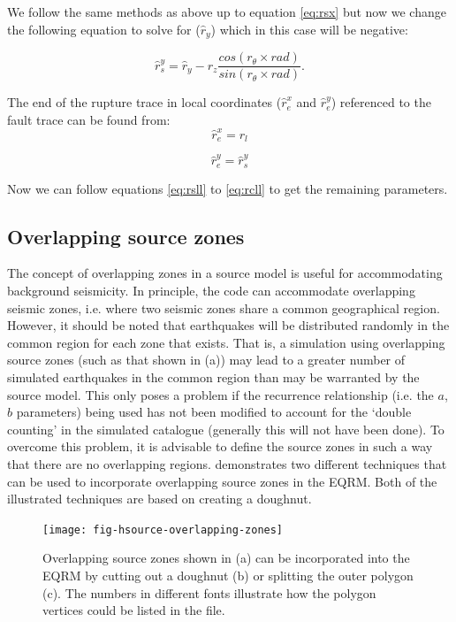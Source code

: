 We follow the same methods as above up to equation \ref{eq:rsx} but now we change the following equation 
to solve for ($\hat{r}_y$) which in this case will be negative:

\begin{equation}\label{eq:ry4}
\hat{r}_s^y = \hat{r}_y -  r_z  \frac{cos(r_\theta  \times rad)}{sin(r_\theta \times rad)}.
\end{equation}

The end of the rupture trace in local coordinates ($\hat{r}_e^x$ and $\hat{r}_e^y$) referenced to the fault 
trace can be found from:
\begin{equation}
\hat{r}_e^x = r_l
\end{equation}

\begin{equation}
\hat{r}_e^y = \hat{r}_s^y
\end{equation}

Now we can follow equations \ref{eq:rsll} to \ref{eq:rcll} to get the remaining parameters.


\subsection{Overlapping source zones}

The concept of overlapping zones in a source model is useful for
accommodating background seismicity. In principle, the code can
accommodate overlapping seismic zones, i.e. where two seismic
zones share a common geographical region. However, it should be
noted that earthquakes will be distributed randomly in the common
region for each zone that exists. That is, a simulation using
overlapping source zones (such as that shown in
(a)) may lead to a greater number
of simulated earthquakes in the common
region than may be warranted by the source model. This only poses
a problem if the recurrence relationship (i.e. the $a$, $b$
parameters) being used has not been modified to account for the
`double counting' in the simulated catalogue (generally this will
not have been done). To overcome this problem, it is advisable to
define the source zones in such a way that there are no
overlapping regions.  demonstrates
two different techniques that can be used to incorporate
overlapping source zones in the EQRM. Both of the illustrated
techniques are based on creating a doughnut.

\begin{figure}[htp]
\texttt{[image: fig-hsource-overlapping-zones]}
\caption{Overlapping source zones shown in (a) can be incorporated
into the EQRM by cutting out a doughnut (b) or splitting the outer
polygon (c). The numbers in different fonts illustrate how the
polygon vertices could be listed in the
 file.
} \label{fig:h-source-overlapping}
\end{figure}



